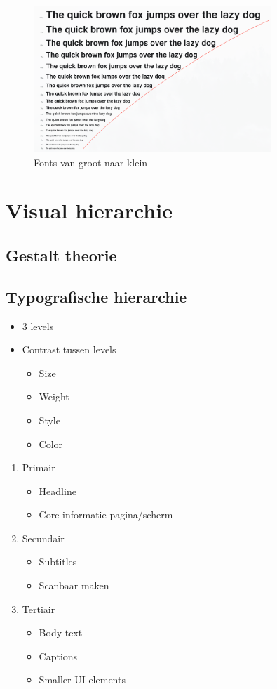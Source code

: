 \documentclass{article}
\begin{document}
\begin{figure}[H]
    \centering
    \includegraphics[width=0.8\textwidth]{img/Screenshot_20200224_101840.png}
    \caption{Fonts van groot naar klein}
\end{figure}

\section{Visual hierarchie}

\subsection{Gestalt theorie}
\subsection{Typografische hierarchie}
\begin{itemize}
    \item 3 levels
    \item Contrast tussen levels
    \begin{itemize}
        \item Size
        \item Weight
        \item Style
        \item Color
    \end{itemize}
\end{itemize}
\begin{enumerate}
    \item Primair
    \begin{itemize}
        \item Headline
        \item Core informatie pagina/scherm
    \end{itemize}
    \item Secundair
    \begin{itemize}
        \item Subtitles
        \item Scanbaar maken
    \end{itemize}
    \item Tertiair
    \begin{itemize}
        \item Body text
        \item Captions
        \item Smaller UI-elements
    \end{itemize}
\end{enumerate}
\end{document}
